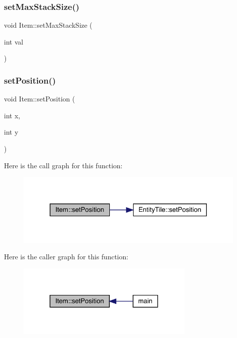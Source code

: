\subsubsection{\texorpdfstring{set\+Max\+Stack\+Size()}{setMaxStackSize()}}
{\footnotesize\ttfamily void Item\+::set\+Max\+Stack\+Size (\begin{DoxyParamCaption}\item[{int}]{val }\end{DoxyParamCaption})}

\mbox{\label{class_item_af8f03acf491fb71ec8cf1e4248bb4b3d}} 
\subsubsection{\texorpdfstring{set\+Position()}{setPosition()}}
{\footnotesize\ttfamily void Item\+::set\+Position (\begin{DoxyParamCaption}\item[{int}]{x,  }\item[{int}]{y }\end{DoxyParamCaption})}

Here is the call graph for this function\+:
\nopagebreak
\begin{figure}[H]
\begin{center}
\leavevmode
\includegraphics[width=317pt]{dc/d32/class_item_af8f03acf491fb71ec8cf1e4248bb4b3d_cgraph}
\end{center}
\end{figure}
Here is the caller graph for this function\+:
\nopagebreak
\begin{figure}[H]
\begin{center}
\leavevmode
\includegraphics[width=244pt]{dc/d32/class_item_af8f03acf491fb71ec8cf1e4248bb4b3d_icgraph}
\end{center}
\end{figure}
\mbox{\label{class_item_a87100c3d13e81e42e58969f817d591ef}} 
